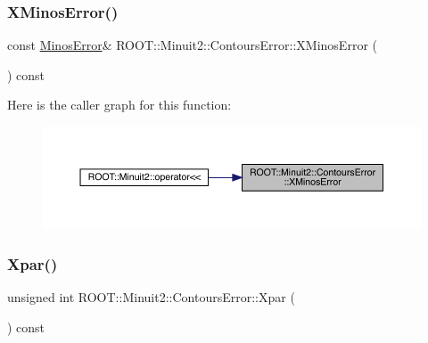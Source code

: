 \mbox{\label{classROOT_1_1Minuit2_1_1ContoursError_a0d14fdab181f06ddd1b38e7dc763718b}} 
\subsubsection{\texorpdfstring{XMinosError()}{XMinosError()}\hspace{0.1cm}{\footnotesize\ttfamily [3/3]}}
{\footnotesize\ttfamily const \mbox{\hyperlink{classROOT_1_1Minuit2_1_1MinosError}{Minos\+Error}}\& R\+O\+O\+T\+::\+Minuit2\+::\+Contours\+Error\+::\+X\+Minos\+Error (\begin{DoxyParamCaption}{ }\end{DoxyParamCaption}) const\hspace{0.3cm}{\ttfamily [inline]}}

Here is the caller graph for this function\+:
\nopagebreak
\begin{figure}[H]
\begin{center}
\leavevmode
\includegraphics[width=350pt]{d3/de9/classROOT_1_1Minuit2_1_1ContoursError_a0d14fdab181f06ddd1b38e7dc763718b_icgraph}
\end{center}
\end{figure}
\mbox{\label{classROOT_1_1Minuit2_1_1ContoursError_a4f04b22b326b30c5a1bf3c0435544e8d}} 
\subsubsection{\texorpdfstring{Xpar()}{Xpar()}\hspace{0.1cm}{\footnotesize\ttfamily [1/3]}}
{\footnotesize\ttfamily unsigned int R\+O\+O\+T\+::\+Minuit2\+::\+Contours\+Error\+::\+Xpar (\begin{DoxyParamCaption}{ }\end{DoxyParamCaption}) const\hspace{0.3cm}{\ttfamily [inline]}}

